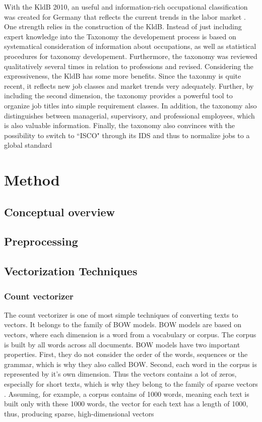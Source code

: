 \documentclass[12pt, a4paper, titlepage]{article}
\begin{document}
With the KldB 2010, an useful and information-rich occupational classification was created for Germany that reflects the current trends in the labor market \citep{Paulus2013}. One strength relies in the construction of the \ac{KldB}. Instead of just including expert knowledge into the Taxonomy the developement process is based on systematical consideration of information about occupations, as well as statistical procedures for taxonomy developement. Furthermore, the taxonomy was reviewed qualitatively several times in relation to professions and revised. Considering the expressiveness, the \ac{KldB} has some more benefits. Since the taxonmy is quite recent, it reflects new job classes and market trends very adequately. Further, by including the second dimension, the taxonomy provides a powerful tool to organize job titles into simple requirement classes.  In addition, the taxonomy also distinguishes between managerial, supervisory, and professional employees, which is also valuable information. Finally, the taxonomy also convinces with the possibility to switch to ``\ac{ISCO}" through its IDS and thus to normalize jobs to a global standard \citep{Bundesagentur2011b}

\section{Method}
\subsection{Conceptual overview}
\subsection{Preprocessing}
\newpage
\subsection{Vectorization Techniques}
\subsubsection{Count vectorizer}
The count vectorizer is one of most simple techniques of converting texts to vectors. It belongs to the family of \ac{BOW} models. \ac{BOW} models are based on vectors, where each dimension is a word from a vocabulary or corpus. The corpus is built by all words across all documents. \ac{BOW} models have two important properties. First, they do not consider the order of the words, sequences or the grammar, which is why they also called \ac{BOW}. Second, each word in the corpus is represented by it's own dimension. Thus the vectors contains a lot of zeros, especially for short texts, which is why they belong to the family of sparse vectors \citep{ajose2020}.  Assuming, for example, a corpus contains of 1000 words, meaning each text is built only with these 1000 words, the vector for each text has a length of 1000, thus, producing sparse, high-dimensional vectors \citep{kulkarni2021, sarkar2016}
\end{document}
